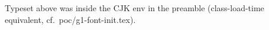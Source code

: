\documentclass{article}
\begin{document}
Typeset above was inside the CJK env in the preamble (class-load-time
equivalent, cf.\ poc/g1-font-init.tex).
\end{document}
